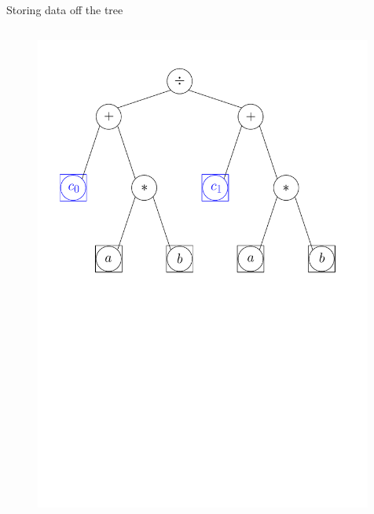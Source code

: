\documentclass[xcolor=dvipsnames]{beamer}
\begin{document}
\begin{frame}[fragile]{Storing data off the tree}
  \begin{columns}[T] %
    \begin{column}{0.75\textwidth}
      \begin{figure}[H]
        \centering
        \includegraphics[width=0.99\textwidth]{fig_exprtree_cb}
      \end{figure}
    \end{column}%
  \end{columns}
\end{frame}
\end{document}
